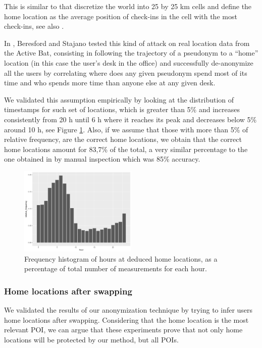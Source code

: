 \documentclass{llncs}
\begin{document}
This is similar to \cite{Cho2011} that discretize the world into 25 by 25 km cells and define the home location as the average position of check-ins in the cell with the most check-ins, see also \cite{scellato2011sociospatial}.

In \cite{Beresford2003}, Beresford and Stajano tested this kind of attack on real location data from the Active Bat, consisting in following the trajectory of a pseudonym to a ``home'' location (in this case the user's desk in the office) and successfully de-anonymize all the users by correlating  where does any given pseudonym spend most of its time and who spends more time than anyone else at any given desk.


We validated this assumption empirically by looking at the distribution of timestamps for such set of locations, which is greater than 5\% and increases consistently from 20 h until 6 h where it reaches its peak and decreases below 5\% around 10 h, see Figure \ref{fig:homehours}.
Also, if we assume that those with more than 5\% of relative frequency, are the correct home locations, we obtain that the correct home locations amount for 83,7\% of the total, a very similar percentage to the one obtained in \cite{Cho2011}
by manual inspection which was 85\% accuracy.


\begin{figure}
\center
  \includegraphics[width=0.5\textwidth]{figures/HomeHour}
\caption{Frequency histogram of hours at deduced home locations, as a percentage of total number of measurements for each hour.}
  \label{fig:homehours}
\end{figure}

\subsubsection{Home locations after swapping}
We validated the results of our anonymization technique by trying to infer users home locations after swapping.
Considering that the home location is the most relevant POI, we can argue that these experiments prove that not only home locations will be protected by our method, but all POIs.
\end{document}
